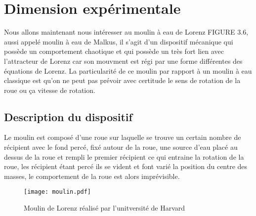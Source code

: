\section{Dimension expérimentale}

Nous allons maintenant nous intéresser au moulin à eau de Lorenz FIGURE 3.6, aussi appelé moulin à eau de Malkus, il s'agit d'un dispositif mécanique qui possède un comportement chaotique et qui possède un très fort lien avec l'attracteur de Lorenz car son mouvment est régi par une forme différentes des équations de Lorenz. La particularité de ce moulin par rapport à un moulin à eau classique est qu'on ne peut pas prévoir avec certitude le sens de rotation de la roue ou ça vitesse de rotation.

\subsection{Description du dispositif}

Le moulin est composé d'une roue sur laquelle se trouve un certain nombre de récipient avec le fond percé, fixé autour de la roue, une source d'eau placé au dessus de la roue et rempli le premier récipient ce qui entraine la rotation de la roue, les récipient étant percé ils se vident et font varié la position du centre des masses, le comportement de la roue est alors imprévisible.

\begin{figure}
    \texttt{[image: moulin.pdf]}
    \caption{Moulin de Lorenz réalisé par l'unitversité de Harvard} 
\end{figure}

